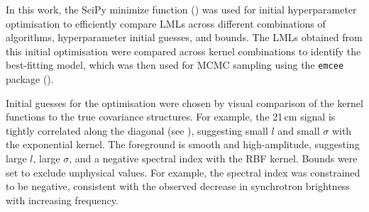 
In this work, the SciPy minimize function (\cite{virtanenSciPy10Fundamental2020}) was used for initial hyperparameter optimisation to efficiently compare LMLs across different combinations of algorithms, hyperparameter initial guesses, and bounds. The LMLs obtained from this initial optimisation were compared across kernel combinations to identify the best-fitting model, which was then used for MCMC sampling using the \texttt{emcee} package (\cite{foreman-mackeyEmceeMCMCHammer2013a}).

Initial guesses for the optimisation were chosen by visual comparison of the kernel functions to the true covariance structures. For example, the 21\,cm signal is tightly correlated along the diagonal (see ), suggesting small $l$ and small $\sigma$ with the exponential kernel. The foreground is smooth and high-amplitude, suggesting large $l$, large $\sigma$, and a negative spectral index with the RBF kernel. Bounds were set to exclude unphysical values. For example, the spectral index was constrained to be negative, consistent with the observed decrease in synchrotron brightness with increasing frequency.


